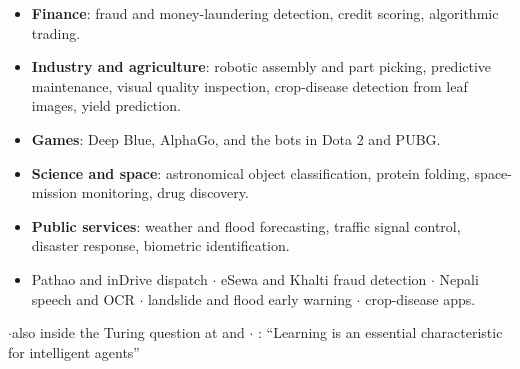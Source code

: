 {\begin{itemize}
        assistants, Nepali NLP tools (Ch\,7).
  \item \textbf{Finance}: fraud and money-laundering detection, credit scoring,
        algorithmic trading.
  \item \textbf{Industry and agriculture}: robotic assembly and part picking, predictive
        maintenance, visual quality inspection, crop-disease detection from leaf images,
        yield prediction.
  \item \textbf{Games}: Deep Blue, AlphaGo, and the bots in Dota 2 and PUBG.
  \item \textbf{Science and space}: astronomical object classification, protein folding,
        space-mission monitoring, drug discovery.
  \item \textbf{Public services}: weather and flood forecasting, traffic signal control,
        disaster response, biometric identification.
\end{itemize}
\begin{itemize}
  \item Pathao and inDrive dispatch $\cdot$ eSewa and Khalti fraud detection $\cdot$ Nepali
        speech and OCR $\cdot$ landslide and flood early warning $\cdot$ crop-disease apps.
\end{itemize}}


{\color{sub}\footnotesize {} 
\gap$\cdot$\gap also inside the Turing question at  and
 \gap$\cdot$\gap
{}: ``Learning is an essential
characteristic for intelligent agents''}


